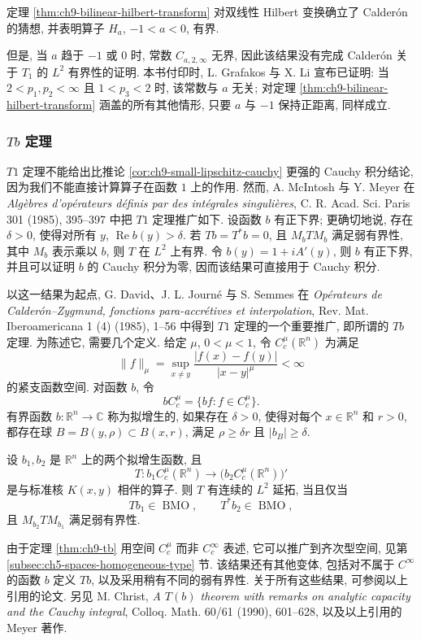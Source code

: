 定理 \ref{thm:ch9-bilinear-hilbert-transform} 对双线性 Hilbert 变换确立了 Calderón 的猜想, 并表明算子 $H_a$, $-1<a<0$, 有界.

\hypertarget{chapter-09-page-227}{}

但是, 当 $a$ 趋于 $-1$ 或 $0$ 时, 常数 $C_{a,2,\infty}$ 无界, 因此该结果没有完成 Calderón 关于 $T_1$ 的 $L^2$ 有界性的证明. 本书付印时, L. Grafakos 与 X. Li 宣布已证明: 当 $2<p_1,p_2<\infty$ 且 $1<p_3<2$ 时, 该常数与 $a$ 无关; 对定理 \ref{thm:ch9-bilinear-hilbert-transform} 涵盖的所有其他情形, 只要 $a$ 与 $-1$ 保持正距离, 同样成立.

\subsubsection{$Tb$ 定理}
\label{subsec:ch9-tb-theorem}

$T1$ 定理不能给出比推论 \ref{cor:ch9-small-lipschitz-cauchy} 更强的 Cauchy 积分结论, 因为我们不能直接计算算子在函数 $1$ 上的作用. 然而, A. McIntosh 与 Y. Meyer 在 
\emph{Algèbres d'opérateurs définis par des intégrales singulières}, C. R. Acad. Sci. Paris 301 (1985), 395--397 中把 $T1$ 定理推广如下. 设函数 $b$ 有正下界; 更确切地说, 存在 $\delta>0$, 使得对所有 $y$, $\operatorname{Re}b(y)>\delta$. 若 $Tb=T^*b=0$, 且 $M_bTM_b$ 满足弱有界性, 其中 $M_b$ 表示乘以 $b$, 则 $T$ 在 $L^2$ 上有界. 令 $b(y)=1+iA'(y)$, 则 $b$ 有正下界, 并且可以证明 $b$ 的 Cauchy 积分为零, 因而该结果可直接用于 Cauchy 积分.

以这一结果为起点, G. David、J. L. Journé 与 S. Semmes 在 
\emph{Opérateurs de Calderón--Zygmund, fonctions para-accrétives et interpolation}, Rev. Mat. Iberoamericana 1 (4) (1985), 1--56 中得到 $T1$ 定理的一个重要推广, 即所谓的 $Tb$ 定理. 为陈述它, 需要几个定义. 给定 $\mu$, $0<\mu<1$, 令 $C_c^\mu(\mathbb R^n)$ 为满足
\[
 \|f\|_\mu=\sup_{x\neq y}\frac{|f(x)-f(y)|}{|x-y|^\mu}<\infty
\]
的紧支函数空间. 对函数 $b$, 令
\[
 bC_c^\mu=\{bf:f\in C_c^\mu\}.
\]
有界函数 $b:\mathbb R^n\to\mathbb C$ 称为拟增生的, 如果存在 $\delta>0$, 使得对每个 $x\in\mathbb R^n$ 和 $r>0$, 都存在球 $B=B(y,\rho)\subset B(x,r)$, 满足 $\rho\geq\delta r$ 且 $|b_B|\geq\delta$.

\begin{Theorem}
\label{thm:ch9-tb}
设 $b_1,b_2$ 是 $\mathbb R^n$ 上的两个拟增生函数, 且
\[
 T:b_1C_c^\mu(\mathbb R^n)\longrightarrow
 \bigl(b_2C_c^\mu(\mathbb R^n)\bigr)'
\]
是与标准核 $K(x,y)$ 相伴的算子. 则 $T$ 有连续的 $L^2$ 延拓, 当且仅当
\[
 Tb_1\in\operatorname{BMO},\qquad T^*b_2\in\operatorname{BMO},
\]
且 $M_{b_2}TM_{b_1}$ 满足弱有界性.
\end{Theorem}

\hypertarget{chapter-09-page-228}{}

由于定理 \ref{thm:ch9-tb} 用空间 $C_c^\mu$ 而非 $C_c^\infty$ 表述, 它可以推广到齐次型空间, 见第 \ref{subsec:ch5-spaces-homogeneous-type} 节. 该结果还有其他变体, 包括对不属于 $C^\infty$ 的函数 $b$ 定义 $Tb$, 以及采用稍有不同的弱有界性. 关于所有这些结果, 可参阅以上引用的论文. 另见 M. Christ, 
\emph{A $T(b)$ theorem with remarks on analytic capacity and the Cauchy integral}, Colloq. Math. 60/61 (1990), 601--628, 以及以上引用的 Meyer 著作.
